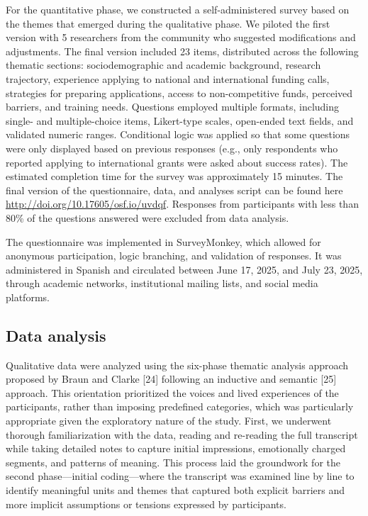 \documentclass[
  letterpaper,
  DIV=11,
  numbers=noendperiod]{scrartcl}
\begin{document}
For the quantitative phase, we constructed a self-administered survey
based on the themes that emerged during the qualitative phase. We
piloted the first version with 5 researchers from the community who
suggested modifications and adjustments. The final version included 23
items, distributed across the following thematic sections:
sociodemographic and academic background, research trajectory,
experience applying to national and international funding calls,
strategies for preparing applications, access to non-competitive funds,
perceived barriers, and training needs. Questions employed multiple
formats, including single- and multiple-choice items, Likert-type
scales, open-ended text fields, and validated numeric ranges.
Conditional logic was applied so that some questions were only displayed
based on previous responses (e.g., only respondents who reported
applying to international grants were asked about success rates). The
estimated completion time for the survey was approximately 15 minutes.
The final version of the questionnaire, data, and analyses script can be
found here \url{http://doi.org/10.17605/osf.io/uvdqf}. Responses from
participants with less than 80\% of the questions answered were excluded
from data analysis.

The questionnaire was implemented in SurveyMonkey, which allowed for
anonymous participation, logic branching, and validation of responses.
It was administered in Spanish and circulated between June 17, 2025, and
July 23, 2025, through academic networks, institutional mailing lists,
and social media platforms.

\subsection{Data analysis}\label{data-analysis}

Qualitative data were analyzed using the six-phase thematic analysis
approach proposed by Braun and Clarke {[}24{]} following an inductive
and semantic {[}25{]} approach. This orientation prioritized the voices
and lived experiences of the participants, rather than imposing
predefined categories, which was particularly appropriate given the
exploratory nature of the study. First, we underwent thorough
familiarization with the data, reading and re-reading the full
transcript while taking detailed notes to capture initial impressions,
emotionally charged segments, and patterns of meaning. This process laid
the groundwork for the second phase---initial coding---where the
transcript was examined line by line to identify meaningful units and
themes that captured both explicit barriers and more implicit
assumptions or tensions expressed by participants.
\end{document}
